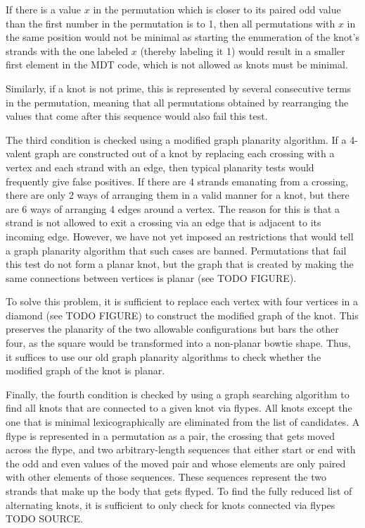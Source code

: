 \begin{paper}
If there is a value $x$ in the permutation which is closer to its paired odd
value than the first number in the permutation is to 1, then all permutations
with $x$ in the same position would not be minimal as starting the enumeration
of the knot's strands with the one labeled $x$ (thereby labeling it 1) would
result in a smaller first element in the MDT code, which is not allowed as knots
must be minimal.

Similarly, if a knot is not prime, this is represented by several consecutive
terms in the permutation, meaning that all permutations obtained by rearranging
the values that come after this sequence would also fail this test.

The third condition is checked using a modified graph planarity algorithm.
If a 4-valent graph are constructed out of a knot by replacing each crossing
with a vertex and each strand with an edge, then typical planarity tests would
frequently give false positives.
If there are 4 strands emanating from a crossing, there are only 2 ways of
arranging them in a valid manner for a knot, but there are 6 ways of arranging
4 edges around a vertex.
The reason for this is that a strand is not allowed to exit a crossing via an
edge that is adjacent to its incoming edge.
However, we have not yet imposed an restrictions that would tell a graph
planarity algorithm that such cases are banned.
Permutations that fail this test do not form a planar knot, but the graph that
is created by making the same connections between vertices is planar (see TODO
FIGURE).

To solve this problem, it is sufficient to replace each vertex with four
vertices in a diamond (see TODO FIGURE) to construct the modified graph of the
knot.
This preserves the planarity of the two allowable configurations but bars the
other four, as the square would be transformed into a non-planar bowtie shape.
Thus, it suffices to use our old graph planarity algorithms to check whether the
modified graph of the knot is planar.

Finally, the fourth condition is checked by using a graph searching algorithm to
find all knots that are connected to a given knot via flypes.
All knots except the one that is minimal lexicographically are eliminated from
the list of candidates.
A flype is represented in a permutation as a pair, the crossing that gets moved
across the flype, and two arbitrary-length sequences that either start or end
with the odd and even values of the moved pair and whose elements are only
paired with other elements of those sequences.
These sequences represent the two strands that make up the body that gets
flyped.
To find the fully reduced list of alternating knots, it is sufficient to only
check for knots connected via flypes TODO SOURCE.


\end{paper}
